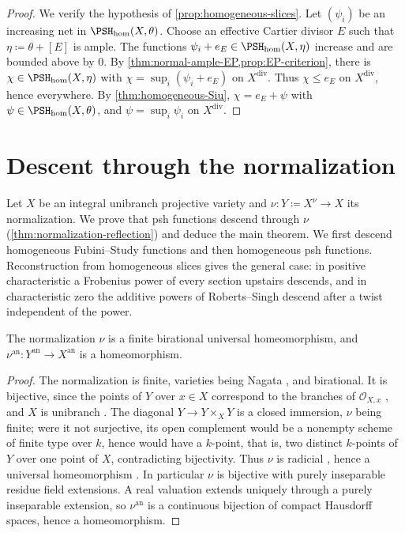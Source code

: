 \documentclass[11pt,a4paper]{article}
\newcommand{\an}{\mathrm{an}}          %
\newcommand{\divv}{\mathrm{div}}       %
\newcommand{\PSHhom}{\PSH_{\mathrm{hom}}}          %
\begin{document}
\begin{proof}
We verify the hypothesis of \cref{prop:homogeneous-slices}. Let $(\psi_i)$ be an increasing net in $\PSHhom(X,\theta)$. Choose an effective Cartier divisor $E$ such that $\eta\coloneqq\theta+[E]$ is ample. The functions $\psi_i+e_E\in\PSHhom(X,\eta)$ increase and are bounded above by $0$. By \cref{thm:normal-ample-EP,prop:EP-criterion}, there is $\chi\in\PSHhom(X,\eta)$ with $\chi=\sup_i(\psi_i+e_E)$ on $X^{\divv}$. Thus $\chi\le e_E$ on $X^{\divv}$, hence everywhere. By \cref{thm:homogeneous-Siu}, $\chi=e_E+\psi$ with $\psi\in\PSHhom(X,\theta)$, and $\psi=\sup_i\psi_i$ on $X^{\divv}$.
\end{proof}

\section{Descent through the normalization}\label{sec:normalization}

Let $X$ be an integral unibranch projective variety and $\nu\colon Y\coloneqq X^\nu\to X$ its normalization. We prove that psh functions descend through $\nu$ (\cref{thm:normalization-reflection}) and deduce the main theorem. We first descend homogeneous Fubini--Study functions and then homogeneous psh functions. Reconstruction from homogeneous slices gives the general case: in positive characteristic a Frobenius power of every section upstairs descends, and in characteristic zero the additive powers of Roberts--Singh descend after a twist independent of the power.

\begin{lemma}\label{lem:unibranch-universal}
The normalization $\nu$ is a finite birational universal homeomorphism, and $\nu^{\an}\colon Y^{\an}\to X^{\an}$ is a homeomorphism.
\end{lemma}

\begin{proof}
The normalization is finite, varieties being Nagata \cite[\href{https://stacks.math.columbia.edu/tag/035B}{Tag 035B} and \href{https://stacks.math.columbia.edu/tag/035S}{Tag 035S}]{Stacks}, and birational. It is bijective, since the points of $Y$ over $x\in X$ correspond to the branches of $\mathcal O_{X,x}$ \cite[\href{https://stacks.math.columbia.edu/tag/0C37}{Tag 0C37} and \href{https://stacks.math.columbia.edu/tag/0C3B}{Tag 0C3B}]{Stacks}, and $X$ is unibranch \cite[\href{https://stacks.math.columbia.edu/tag/0BQ2}{Tag 0BQ2}]{Stacks}. The diagonal $Y\to Y\times_XY$ is a closed immersion, $\nu$ being finite; were it not surjective, its open complement would be a nonempty scheme of finite type over $k$, hence would have a $k$-point, that is, two distinct $k$-points of $Y$ over one point of $X$, contradicting bijectivity. Thus $\nu$ is radicial \cite[\href{https://stacks.math.columbia.edu/tag/01S4}{Tag 01S4}]{Stacks}, hence a universal homeomorphism \cite[\href{https://stacks.math.columbia.edu/tag/04DF}{Tag 04DF}]{Stacks}. In particular $\nu$ is bijective with purely inseparable residue field extensions. A real valuation extends uniquely through a purely inseparable extension, so $\nu^{\an}$ is a continuous bijection of compact Hausdorff spaces, hence a homeomorphism.
\end{proof}
\end{document}
